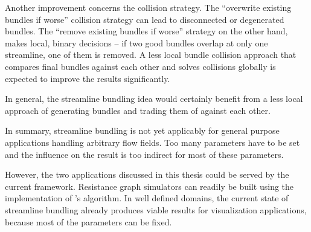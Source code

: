 Another improvement concerns the collision strategy. The ``overwrite existing bundles if worse'' collision strategy can lead to disconnected or degenerated bundles. The ``remove existing bundles if worse'' strategy on the other hand, makes local, binary decisions -- if two good bundles overlap at only one streamline, one of them is removed. A less local bundle collision approach that compares final bundles against each other and solves collisions globally is expected to improve the results significantly.

In general, the streamline bundling idea would certainly benefit from a less local approach of generating bundles and trading them of against each other. 


In summary, streamline bundling is not yet applicably for general purpose applications handling arbitrary flow fields. Too many parameters have to be set and the influence on the result is too indirect for most of these parameters.

However, the two applications discussed in this thesis could be served by the current framework.
Resistance graph simulators can readily be built using the implementation of 's algorithm. In well defined domains, the current state of streamline bundling already produces viable results for visualization applications, because most of the parameters can be fixed.



%





